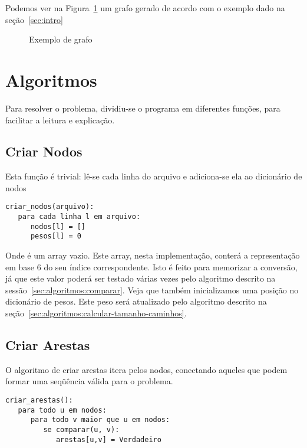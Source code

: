 \documentclass[12pt]{article}
\begin{document}

Podemos ver na Figura~\ref{fig:testeprof} um grafo gerado de acordo com o exemplo dado na se\c{c}ão~\ref{sec:intro}

\begin{figure}[h!]
    \begin{dot2tex}[neato,options=-tmath]
        
    \end{dot2tex}
    \caption{Exemplo de grafo}
    \label{fig:testeprof}
\end{figure}


\section{Algoritmos}\label{sec:algoritmos}
Para resolver o problema, dividiu-se o programa em diferentes fun\c{c}ões, para facilitar a leitura e explica\c{c}ão.

\subsection{Criar Nodos}\label{sec:algoritmos:criar-nodos}
Esta fun\c{c}ão é trivial: lê-se cada linha do arquivo e adiciona-se ela ao dicionário de nodos
\begin{lstlisting}
criar_nodos(arquivo):
   para cada linha l em arquivo:
      nodos[l] = []
      pesos[l] = 0
\end{lstlisting}

Onde {\sf []} é um \textsf{array} vazio. Este array, nesta implementa\c{c}ão, conterá a representa\c{c}ão em base 6 do seu índice correspondente. Isto é feito para memorizar a conversão, já que este valor poderá ser testado várias vezes pelo algoritmo descrito na sessão~\ref{sec:algoritmos:comparar}.
Veja que também inicializamos uma posi\c{c}ão no dicionário de pesos. Este peso será atualizado pelo algoritmo descrito na se\c{c}ão~\ref{sec:algoritmos:calcular-tamanho-caminhos}.

\subsection{Criar Arestas}\label{sec:algoritmos:criar-arestas}
O algoritmo de criar arestas itera pelos nodos, conectando aqueles que podem formar uma seqüência válida para o problema.
\begin{lstlisting}
criar_arestas():
   para todo u em nodos:
      para todo v maior que u em nodos:
         se comparar(u, v):
            arestas[u,v] = Verdadeiro
\end{lstlisting}
\end{document}

